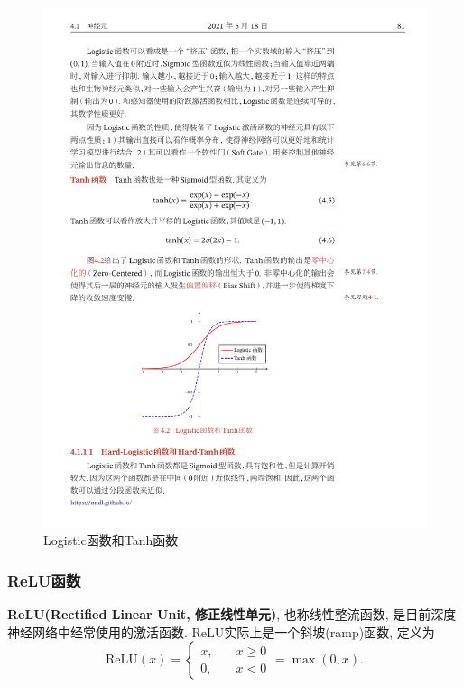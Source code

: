 \documentclass[12pt, a4paper, oneside]{ctexart}
\begin{document}
\begin{figure}[htbp]
    \centering
    \includegraphics[scale=1.5]{Logistic和Tanh.pdf}
    \caption{Logistic函数和Tanh函数\protect\footnotemark[1]}
    \label{figure-函数对比}
\end{figure}
\subsubsection{ReLU函数}\textbf{ReLU(Rectified Linear Unit, 修正线性单元)}, 也称线性整流函数, 是目前深度神经网络中经常使用的激活函数. ReLU实际上是一个斜坡(ramp)函数, 定义为
\begin{equation}
    \text{ReLU}(x) = \begin{cases}
        x,&\quad x \geqslant 0\\
        0,&\quad x < 0
    \end{cases} = \max(0, x).
\end{equation}
\end{document}

